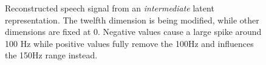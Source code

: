 \begin{figure}
	\centering
	\begin{subfigure}{0.34\textwidth}
		\centering
		
	\end{subfigure}\hfill
	\begin{subfigure}{0.3\textwidth}
		\centering
		
	\end{subfigure}\hfill
	\begin{subfigure}{0.3\textwidth}
		\centering
		
	\end{subfigure}
	
	\vspace{0.5cm} %
	
	\begin{subfigure}{0.36\textwidth}
		\centering
		
	\end{subfigure}\hfill
	\begin{subfigure}{0.3\textwidth}
		\centering
		
	\end{subfigure}\hfill
	\begin{subfigure}{0.3\textwidth}
		\centering
		
	\end{subfigure}
	
	\caption{Reconstructed speech signal from an \textit{intermediate} latent representation. The twelfth dimension is being modified, while other dimensions are fixed at 0. Negative values cause a large spike around 100 Hz while positive values fully remove the 100Hz and influences the 150Hz range instead.}
	\label{fig:interpol_dim12}
\end{figure}


